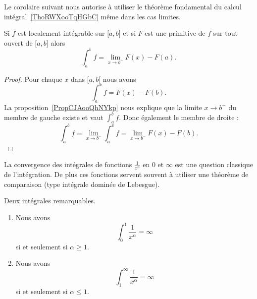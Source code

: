Le corolaire suivant nous autorise à utiliser le théorème fondamental du calcul intégral~\ref{ThoRWXooTqHGbC} même dans les cas limites.
\begin{corollary}   \label{CorMUIooXREleR}
	Si \( f\) est localement intégrable sur \( \mathopen[ a , b \mathclose]\) et si \( F\) est une primitive de \( f\) sur tout ouvert de \( \mathopen[ a , b \mathclose]\) alors
	\begin{equation}
		\int_a^bf=\lim_{x\to b^-} F(x)-F(a).
	\end{equation}
\end{corollary}

\begin{proof}
	Pour chaque \( x\) dans \( \mathopen[ a , b [\) nous avons
	\begin{equation}
		\int_a^xf=F(x)-F(b).
	\end{equation}
	La proposition~\ref{PropCJAooQhNYkp} nous explique que la limite \( x\to b^-\) du membre de gauche existe et vaut \( \int_a^bf\). Donc également le membre de droite :
	\begin{equation}
		\int_a^bf=\lim_{x\to b^-} \int_a^xf=\lim_{x\to b^-} F(x)-F(b).
	\end{equation}
\end{proof}

La convergence des intégrales de fonctions \( \frac{1}{ x^{\alpha} }\) en \( 0\) et \( \infty\) est une question classique de l'intégration. De plus ces fonctions servent souvent à utiliser une théorème de comparaison (type intégrale dominée de Lebesgue).
\begin{proposition} \label{PropBKNooPDIPUc}
	Deux intégrales remarquables.
	\begin{enumerate}
		\item

		      Nous avons
		      \begin{equation}
			      \int_0^1\frac{1}{ x^\alpha }=\infty
		      \end{equation}
		      si et seulement si \( \alpha\geq 1\).

		\item   \label{ITEMooJFSXooHmgmEj}

		      Nous avons
		      \begin{equation}
			      \int_1^{\infty}\frac{1}{ x^{\alpha} }=\infty
		      \end{equation}
		      si et seulement si \( \alpha\leq1\).

	\end{enumerate}

\end{proposition}

